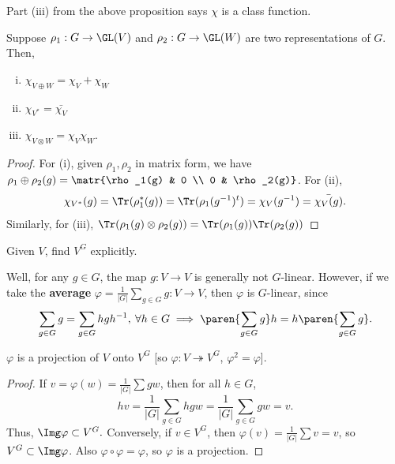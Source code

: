 \begin{rmk}
    Part (iii) from the above proposition says $\chi$ is a class function.
\end{rmk}

\begin{prop}[][label=prop:prop2]
    Suppose $\rho _1:G \to \GL(V)$ and $\rho_2:G \to \GL(W)$ are two representations of $G$. Then,
    \begin{enumerate}[(i)]
        \item $\chi _{V \oplus W}=\chi_V + \chi _W$
        \item $\chi _{V^*}=\bar{\chi _V}$
        \item $\chi_{V \otimes W}=\chi_V\chi _W$.
    \end{enumerate}
\end{prop}

\begin{proof}
    For (i), given $\rho_1,\rho _2$ in matrix form, we have $\rho_1 \oplus \rho_2(g)=\matr{\rho_1(g) & 0 \\ 0 & \rho_2(g)}$. For (ii),
    $$\chi _{V^*}(g) =\Tr(\rho_1^*(g))=\Tr(\rho_1(g^{-1})^t)=\chi _V(g^{-1})=\bar{\chi _V(g)}.$$
    Similarly, for (iii),
    $\Tr(\rho_1(g) \otimes \rho_2(g))=\Tr(\rho_1(g))\Tr(\rho _2(g))$
\end{proof}

\begin{notebox*}[Question]
    Given $V$, find $V^G$ explicitly.
\end{notebox*}

Well, for any $g \in G$, the map $g:V \to V$ is generally not $G$-linear. However, if we take the \textbf{average} $\varphi=\frac{1}{|G|} \sum_{g \in G}g:V \to V$, then $\varphi$ is $G$-linear, since
$$\sum _{g \in G}g=\sum _{g \in G}hgh^{-1},\: \forall h \in G \implies \paren{\sum_{g \in G}g}h=h\paren{\sum_{g \in G}g}.$$

\begin{prop}
    $\varphi$ is a projection of $V$ onto $V^G$ [so $\varphi :V \twoheadrightarrow V^G$, $\varphi ^2=\varphi$].
\end{prop}

\begin{proof}
    If $v = \varphi (w) = \frac{1}{|G|}\sum gw$, then for all $h \in G$,
    $$hv = \frac{1}{|G|}\sum_{g \in G}hgw=\frac{1}{|G|}\sum_{g \in G}gw=v.$$
    Thus, $\Img \varphi \subset V^G.$ Conversely, if $v \in V^G$, then $\varphi (v)=\frac{1}{|G|}\sum v =v$, so $V^G \subset \Img \varphi$. Also $\varphi \circ \varphi = \varphi$, so $\varphi$ is a projection.
\end{proof}


